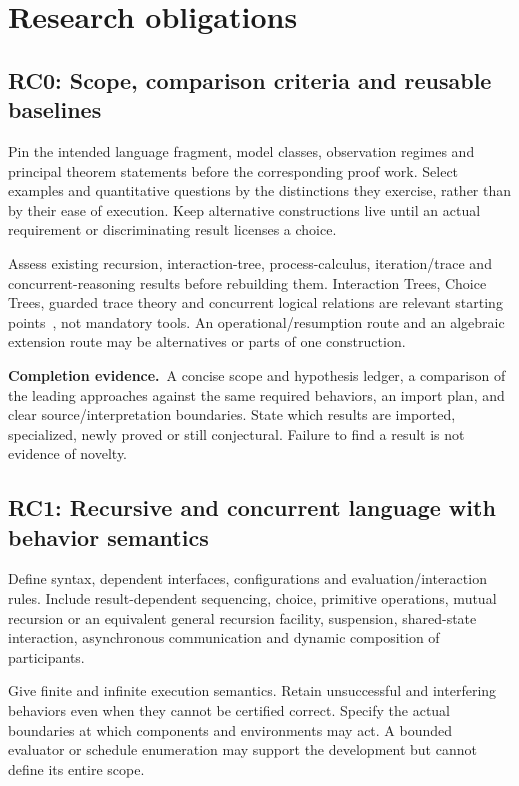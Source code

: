 \documentclass[11pt,a4paper]{article}
\newcommand{\deliver}{\par\textbf{Completion evidence.}\ }
\begin{document}
\section{Research obligations}\label{sec:obligations}

\subsection*{RC0: Scope, comparison criteria and reusable baselines}\label{rc0}
Pin the intended language fragment, model classes, observation regimes and principal theorem statements before the corresponding proof work. Select examples and quantitative questions by the distinctions they exercise, rather than by their ease of execution. Keep alternative constructions live until an actual requirement or discriminating result licenses a choice.

Assess existing recursion, interaction-tree, process-calculus, iteration/trace and concurrent-reasoning results before rebuilding them. Interaction Trees, Choice Trees, guarded trace theory and concurrent logical relations are relevant starting points~\cite{itrees,ctrees,guarded,reloc}, not mandatory tools. An operational/resumption route and an algebraic extension route may be alternatives or parts of one construction.

\deliver A concise scope and hypothesis ledger, a comparison of the leading approaches against the same required behaviors, an import plan, and clear source/interpretation boundaries. State which results are imported, specialized, newly proved or still conjectural. Failure to find a result is not evidence of novelty.

\subsection*{RC1: Recursive and concurrent language with behavior semantics}\label{rc1}
Define syntax, dependent interfaces, configurations and evaluation/interaction rules. Include result-dependent sequencing, choice, primitive operations, mutual recursion or an equivalent general recursion facility, suspension, shared-state interaction, asynchronous communication and dynamic composition of participants.

Give finite and infinite execution semantics. Retain unsuccessful and interfering behaviors even when they cannot be certified correct. Specify the actual boundaries at which components and environments may act. A bounded evaluator or schedule enumeration may support the development but cannot define its entire scope.
\end{document}
